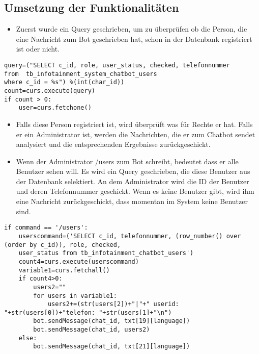 \subsection{Umsetzung der Funktionalitäten}
\begin{itemize}
	\item Zuerst wurde ein Query geschrieben, um zu überprüfen ob die Person, die eine Nachricht zum Bot geschrieben hat, schon in der Datenbank registriert ist oder nicht. \\
\end{itemize} 
\begin{lstlisting}[frame=single]
query=("SELECT c_id, role, user_status, checked, telefonnummer 
from  tb_infotainment_system_chatbot_users 
where c_id = %s") %(int(char_id))
count=curs.execute(query)
if count > 0:
	user=curs.fetchone()
\end{lstlisting}
\begin{itemize}
	\item Falls diese Person registriert ist, wird überprüft was f\"ur Rechte er hat. Falls er ein Administrator ist, werden die Nachrichten, die er zum Chatbot sendet analysiert und die entsprechenden Ergebnisse zurückgeschickt. 
\end{itemize}	
\begin{itemize}
	\item Wenn der Administrator /users zum Bot schreibt, bedeutet dass er alle Benutzer sehen will. Es wird ein Query geschrieben, die diese Benutzer aus der Datenbank selektiert. An dem Administrator wird die ID der Benutzer und deren Telefonnummer geschickt. Wenn es keine Benutzer gibt, wird ihm eine Nachricht zur\"uckgeschickt, dass momentan im System keine Benutzer sind.
\end{itemize}
\begin{lstlisting}[frame=single]
if command == '/users':
	userscommand=('SELECT c_id, telefonnummer, (row_number() over (order by c_id)), role, checked,
	user_status from tb_infotainment_chatbot_users')
	count4=curs.execute(userscommand)
	variable1=curs.fetchall()
	if count4>0:
		users2=""
		for users in variable1:
			users2+=(str(users[2])+"|"+" userid: "+str(users[0])+"telefon: "+str(users[1]+"\n")
		bot.sendMessage(chat_id, txt[19][language])
		bot.sendMessage(chat_id, users2)
	else:
		bot.sendMessage(chat_id, txt[21][language])
	
\end{lstlisting}
